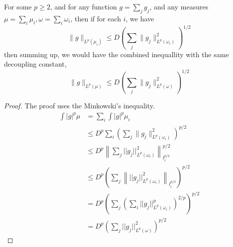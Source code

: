 \begin{proposition}
    For some $p\geq 2$, and for any function $g=\sum_jg_j$, and any measures $\mu=\sum_i\mu_i, \omega=\sum_i\omega_i$, then if for each $i$, we have
    \begin{equation*}
        \|g\|_{L^p(\mu_i)}\leq D\left(\sum_j\|g_j\|_{L^p(\omega_i)}^2 \right)^{1/2}
    \end{equation*}
    then summing up, we would have the combined inequallity with the same decoupling constant,
    \begin{equation*}
        \|g\|_{L^p(\mu)}\leq D\left(\sum_j\|g_j\|_{L^p(\omega)}^2 \right)^{1/2}
    \end{equation*}
\end{proposition}
\begin{proof}
    The proof uses the Minkowski's inequality.
    \begin{align*}
        \int|g|^p\mu&=\sum_i\int|g|^p\mu_i\\
        &\leq D^p\sum_i\left(\sum_j\|g_j\|_{L^p(\omega_i)}^2 \right)^{p/2}\\
        &\leq D^p \left\|\sum_j||g_j||_{L^p(\omega_i)}^2 \right\|_{l_i^{p/2}}^{p/2}\\
        &\leq D^p\left(\sum_j\left\|||g_j||_{L^p(\omega_i)}^2 \right\|_{l_i^{p/2}}\right)^{p/2}\\
        &=D^p\left(\sum_j\left(\sum_i||g_j||_{L^p(\omega_i)}^p\right)^{2/p} \right)^{p/2}\\
        &=D^p\left(\sum_j||g_j||_{L^p(\omega)}^2 \right)^{p/2}
    \end{align*}
\end{proof}